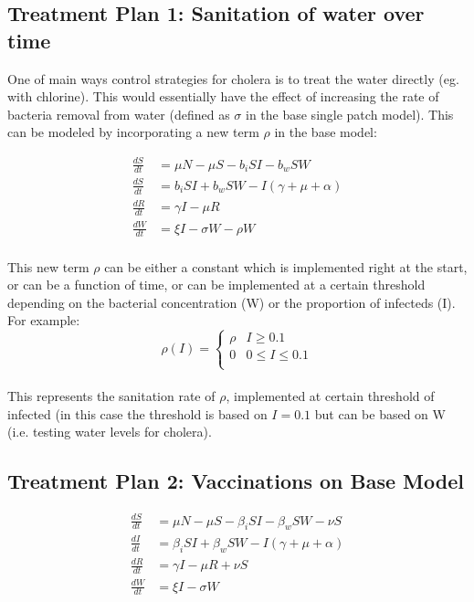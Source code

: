 \documentclass[12pt]{article}\usepackage[]{graphicx}\usepackage[]{color}
\begin{document}
\subsection{Treatment Plan 1: Sanitation of water over time}
One of main ways control strategies for cholera is to treat the water directly (eg. with chlorine). This would essentially have the effect of increasing the rate of bacteria removal from water (defined as $\sigma$ in the base single patch model). This can be modeled by incorporating a new term $\rho$ in the base model:
\begin{linenomath}
\begin{align*}
	\frac{dS}{dt}&= \mu N - \mu S - b_i SI - b_w S W  \\
	\frac{dS}{dt}&= b_i S I + b_w S W - I (\gamma + \mu + \alpha) \\
	\frac{dR}{dt}&= \gamma I - \mu R \\
	\frac{dW}{dt}&= \xi I  - \sigma W - \rho W\\
\end{align*}
\end{linenomath}

This new term $\rho$ can be either a constant which is implemented right at the start, or can be a function of time, or can be implemented at a certain threshold depending on the bacterial concentration (W) or the proportion of infecteds (I). For example:
$$\rho (I)= \begin{cases}
	\rho & I \geq 0.1 \\
	0 & 0 \leq I \leq 0.1 \\
	\end{cases}$$\\
This represents the sanitation rate of $\rho$, implemented at certain threshold of infected (in this case the threshold is based on $I=0.1$ but can be based on W (i.e. testing water levels for cholera).\\


\subsection{Treatment Plan 2: Vaccinations on Base Model}

\begin{linenomath}
\begin{align*}
	\frac{dS}{dt}&= \mu N - \mu S - \beta_i SI - \beta_w S W - \nu S \\
	\frac{dI}{dt}&= \beta_i S I + \beta_w S W - I (\gamma + \mu + \alpha) \\
	\frac{dR}{dt}&= \gamma I - \mu R + \nu S\\
	\frac{dW}{dt}&= \xi I  - \sigma W\\
\end{align*}
\end{linenomath}
\end{document}

